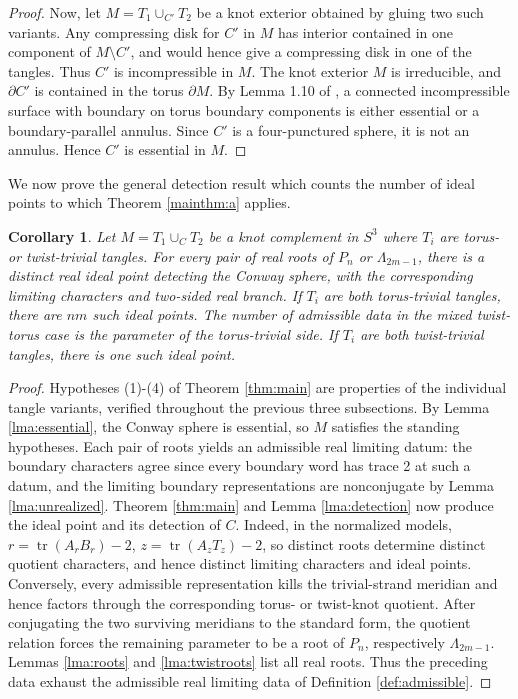 \documentclass{article}
\DeclareMathOperator{\tr}{tr}
\theoremstyle{plain}
\theoremstyle{definition}
\theoremstyle{plain}
\theoremstyle{plain}
\newtheorem{corollary}[theorem]{Corollary}
\theoremstyle{plain}
\theoremstyle{remark}
\theoremstyle{remark}
\theoremstyle{plain}
\theoremstyle{plain}
\newcounter{main}
\theoremstyle{plain}
\theoremstyle{plain}
\begin{document}
\begin{proof}
\medskip

Now, let $M = T_1 \cup_{C'}T_2$ be a knot exterior obtained by gluing two such variants. Any compressing disk for $C'$ in $M$ has interior contained in one component of $M \setminus C'$, and would hence give a compressing disk in one of the tangles. Thus $C'$ is incompressible in $M$. The knot exterior $M$ is irreducible, and $\partial C'$ is contained in the torus $\partial M$. By Lemma 1.10 of \cite{hatcher}, a connected incompressible surface with boundary on torus boundary components is either essential or a boundary-parallel annulus. Since $C'$ is a four-punctured sphere, it is not an annulus. Hence $C'$ is essential in $M$. 
\end{proof}

We now prove the general detection result which counts the number of ideal points to which Theorem \ref{mainthm:a} applies.

\begin{corollary}\label{cor:generaldetection}
Let $M = T_1 \cup_CT_2$ be a knot complement in $S^3$ where $T_i$ are torus- or twist-trivial tangles. For every pair of real roots of $P_n$ or $\Lambda_{2m-1}$, there is a distinct real ideal point detecting the Conway sphere, with the corresponding limiting characters and two-sided real branch. If $T_i$ are both torus-trivial tangles, there are $nm$ such ideal points. The number of admissible data in the mixed twist-torus case is the parameter of the torus-trivial side. If $T_i$ are both twist-trivial tangles, there is one such ideal point.
\end{corollary}

\begin{proof}
Hypotheses (1)-(4) of Theorem \ref{thm:main} are properties of the individual tangle variants, verified throughout the previous three subsections. By Lemma \ref{lma:essential}, the Conway sphere is essential, so $M$ satisfies the standing hypotheses. Each pair of roots yields an admissible real limiting datum: the boundary characters agree since every boundary word has trace 2 at such a datum, and the limiting boundary representations are nonconjugate by Lemma \ref{lma:unrealized}. Theorem \ref{thm:main} and Lemma \ref{lma:detection} now produce the ideal point and its detection of $C$. Indeed, in the normalized models, $r = \tr(A_rB_r) - 2$, $z = \tr(A_zT_z) - 2$, so distinct roots determine distinct quotient characters, and hence distinct limiting characters and ideal points. Conversely, every admissible representation kills the trivial-strand meridian and hence factors through the corresponding torus- or twist-knot quotient. After conjugating the two surviving meridians to the standard form, the quotient relation forces the remaining parameter to be a root of $P_n$, respectively $\Lambda_{2m-1}$. Lemmas \ref{lma:roots} and \ref{lma:twistroots} list all real roots. Thus the preceding data exhaust the admissible real limiting data of Definition \ref{def:admissible}.
\end{proof}
\end{document}
